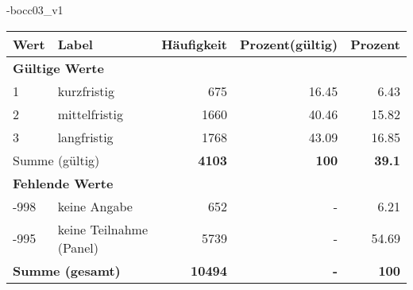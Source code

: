                 \vspace*{-\baselineskip}
					\begin{filecontents}{\jobname-bocc03_v1}
					\begin{longtable}{lXrrr}
					\toprule
					\textbf{Wert} & \textbf{Label} & \textbf{Häufigkeit} & \textbf{Prozent(gültig)} & \textbf{Prozent} \\
					\endhead
					\midrule
					\multicolumn{5}{l}{\textbf{Gültige Werte}}\\

					1 &
					\multicolumn{1}{X}{ kurzfristig   } &


					  \num{675} &
					  \num[round-mode=places,round-precision=2]{16,45} &
					    \num[round-mode=places,round-precision=2]{6,43} \\

					2 &
					\multicolumn{1}{X}{ mittelfristig   } &


					  \num{1660} &
					  \num[round-mode=places,round-precision=2]{40,46} &
					    \num[round-mode=places,round-precision=2]{15,82} \\

					3 &
					\multicolumn{1}{X}{ langfristig   } &


					  \num{1768} &
					  \num[round-mode=places,round-precision=2]{43,09} &
					    \num[round-mode=places,round-precision=2]{16,85} \\
					\midrule
					\multicolumn{2}{l}{Summe (gültig)} &
					  \textbf{\num{4103}} &
					\textbf{100} &
					  \textbf{\num[round-mode=places,round-precision=2]{39,1}} \\
					\multicolumn{5}{l}{\textbf{Fehlende Werte}}\\
							-998 &
							keine Angabe &
							  \num{652} &
							 - &
							  \num[round-mode=places,round-precision=2]{6,21} \\
							-995 &
							keine Teilnahme (Panel) &
							  \num{5739} &
							 - &
							  \num[round-mode=places,round-precision=2]{54,69} \\
					\midrule
					\multicolumn{2}{l}{\textbf{Summe (gesamt)}} &
				      \textbf{\num{10494}} &
				    \textbf{-} &
				    \textbf{100} \\
					\bottomrule
					\end{longtable}
					\end{filecontents}
